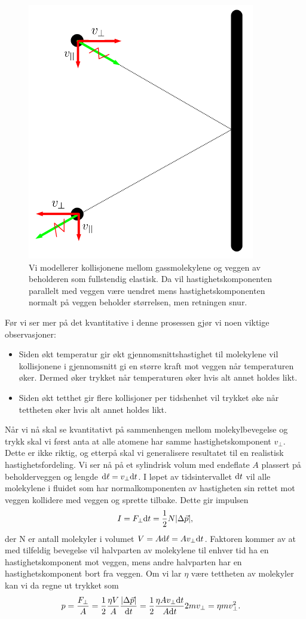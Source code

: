 \begin{figure}[tp]
\begin{center}
	\includegraphics[height=.4\textwidth]{./DeltaVkollisjon}
	\caption{Vi modellerer kollisjonene mellom gassmolekylene og veggen av beholderen som fullstendig elastisk. Da vil hastighetskomponenten parallelt med veggen være uendret mens hastighetskomponenten normalt på veggen beholder størrelsen, men retningen snur.}
	\label{fig:kinetiskgassteori:deltaV}
\end{center}
\end{figure}

Før vi ser mer på det kvantitative i denne prosessen gjør vi noen viktige observasjoner:
\begin{itemize}
\item
Siden økt temperatur gir økt gjennomsnittshastighet til molekylene vil kollisjonene i gjennomsnitt gi en større kraft mot veggen når temperaturen øker. Dermed øker trykket når temperaturen øker hvis alt annet holdes likt.
\item
Siden økt tetthet gir flere kollisjoner per tidshenhet vil trykket øke når tettheten øker hvis alt annet holdes likt.
\end{itemize}

Når vi nå skal se kvantitativt på sammenhengen mellom molekylbevegelse og trykk skal vi først anta at alle atomene har samme hastighetskomponent $v_\perp$. Dette er ikke riktig, og etterpå skal vi generalisere resultatet til en realistisk hastighetsfordeling.
Vi ser nå på et sylindrisk volum med endeflate $A$ plassert på beholderveggen og lengde $\text{d}\ell = v_\perp \text{d} t$. I løpet av tidsintervallet $\text{d} t$ vil alle molekylene i fluidet som har normalkomponenten av hastigheten sin rettet mot veggen kollidere med veggen og sprette tilbake. Dette gir impulsen
\begin{displaymath}
	I = F_\perp\text{d} t = \frac{1}{2} N|\Delta \vec{p}|,
\end{displaymath}
der N er antall molekyler i volumet $V = A\text{d}\ell  = Av_\perp\text{d} t$. Faktoren \half kommer av at med tilfeldig bevegelse vil halvparten av molekylene til enhver tid ha en hastighetskomponent mot veggen, mens andre halvparten har en hastighetskomponent bort fra veggen. Om vi lar $\eta$ være tettheten av molekyler kan vi da regne ut trykket som
\begin{displaymath}
\begin{aligned}
	p = \frac{F_\perp}{A} &= \frac{1}{2}\frac{\eta V}{A}\frac{|\Delta \vec{p}|}{\text{d} t} 
	= \frac{1}{2}\frac{\eta Av_\perp\text{d} t}{A\text{d} t}2mv_\perp 
	= \eta mv_\perp^2.
\end{aligned}
\end{displaymath}


